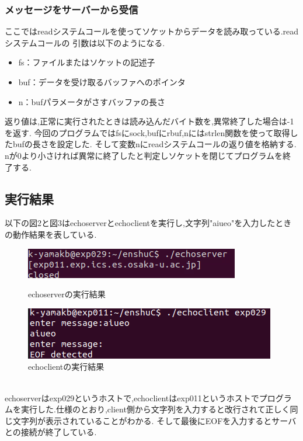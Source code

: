 \documentclass[dvipdfmx]{jarticle}
\begin{document}
\subsubsection{メッセージをサーバーから受信}
ここではreadシステムコールを使ってソケットからデータを読み取っている.readシステムコールの
引数は以下のようになる.\cite{10}
\begin{itemize}
    \item fs：ファイルまたはソケットの記述子
    \item buf：データを受け取るバッファへのポインタ
    \item n：bufパラメータがさすバッファの長さ
\end{itemize}
返り値は,正常に実行されたときは読み込んだバイト数を,異常終了した場合は-1を返す.\cite{11}
今回のプログラムではfsにsock,bufにrbuf,nにはstrlen関数を使って取得したbufの長さを設定した.
そして変数nにreadシステムコールの返り値を格納する.
nが0より小さければ異常に終了したと判定しソケットを閉じてプログラムを終了する.
\subsection{実行結果}
以下の図2と図3はechoserverとechoclientを実行し,文字列"aiueo"を入力したときの動作結果を表している.
\begin{figure}[htbp]
    \begin{minipage}[b]{0.45\linewidth}
      \centering
      \includegraphics[keepaspectratio, scale=0.5]{2-1server.png}
      \caption{echoserverの実行結果}
    \end{minipage}
    \begin{minipage}[b]{0.45\linewidth}
      \centering
      \includegraphics[keepaspectratio, scale=0.5]{2-1client.png}
      \caption{echoclientの実行結果}
    \end{minipage}
\end{figure}
\\echoserverはexp029というホストで,echoclientはexp011というホストでプログラムを実行した.仕様のとおり,client側から文字列を入力すると改行されて正しく同じ文字列が表示されていることがわかる.
そして最後にEOFを入力するとサーバとの接続が終了している.
\end{document}
